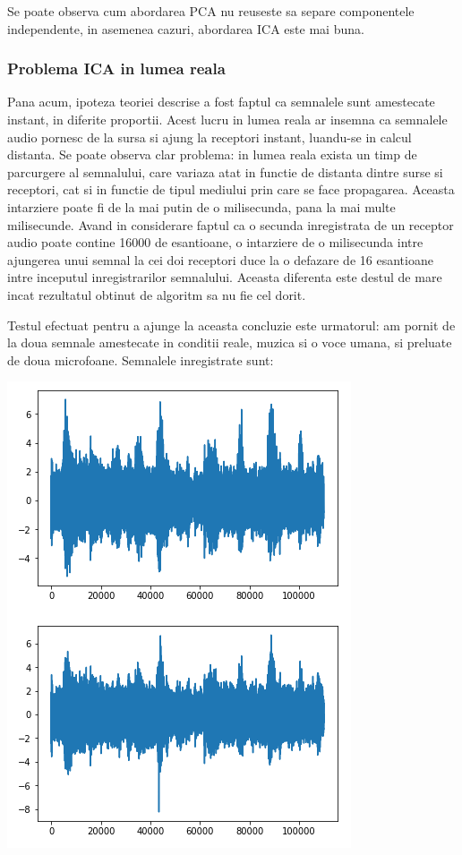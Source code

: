 \documentclass[12pt]{article}
\begin{document}
 Se poate observa cum abordarea PCA nu reuseste sa separe componentele independente, in asemenea cazuri, abordarea ICA este mai buna.

\subsubsection{Problema ICA in lumea reala}
Pana acum, ipoteza teoriei descrise a fost faptul ca semnalele sunt amestecate instant, in diferite proportii. Acest lucru in lumea reala ar insemna ca semnalele audio pornesc de la sursa si ajung la receptori instant, luandu-se in calcul distanta. Se poate observa clar problema: in lumea reala exista un timp de parcurgere al semnalului, care variaza atat in functie de distanta dintre surse si receptori, cat si in functie de tipul mediului prin care se face propagarea. Aceasta intarziere poate fi de la mai putin de o milisecunda, pana la mai multe milisecunde. Avand in considerare faptul ca o secunda inregistrata de un receptor audio poate contine 16000 de esantioane, o intarziere de o milisecunda intre ajungerea unui semnal la cei doi receptori duce la o defazare de 16 esantioane intre inceputul inregistrarilor semnalului. Aceasta diferenta este destul de mare incat rezultatul obtinut de algoritm sa nu fie cel dorit. 

Testul efectuat pentru a ajunge la aceasta concluzie este urmatorul: am pornit de la doua semnale amestecate in conditii reale, muzica si o voce umana, si preluate de doua microfoane. Semnalele inregistrate sunt:
\begin{center}
	\includegraphics[scale=1]{real_mixed}
 \end{center}
\end{document}
